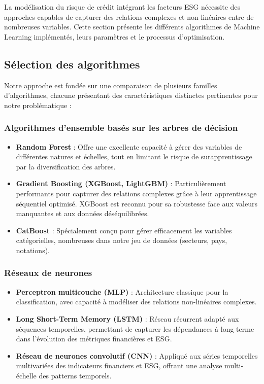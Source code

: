 La modélisation du risque de crédit intégrant les facteurs ESG nécessite des approches capables de capturer des relations complexes et non-linéaires entre de nombreuses variables. Cette section présente les différents algorithmes de Machine Learning implémentés, leurs paramètres et le processus d'optimisation.

\subsection{Sélection des algorithmes}

Notre approche est fondée sur une comparaison de plusieurs familles d'algorithmes, chacune présentant des caractéristiques distinctes pertinentes pour notre problématique :

\subsubsection{Algorithmes d'ensemble basés sur les arbres de décision}
\begin{itemize}
  \item \textbf{Random Forest} : Offre une excellente capacité à gérer des variables de différentes natures et échelles, tout en limitant le risque de surapprentissage par la diversification des arbres.
  \item \textbf{Gradient Boosting (XGBoost, LightGBM)} : Particulièrement performants pour capturer des relations complexes grâce à leur apprentissage séquentiel optimisé. XGBoost est reconnu pour sa robustesse face aux valeurs manquantes et aux données déséquilibrées.
  \item \textbf{CatBoost} : Spécialement conçu pour gérer efficacement les variables catégorielles, nombreuses dans notre jeu de données (secteurs, pays, notations).
\end{itemize}

\subsubsection{Réseaux de neurones}
\begin{itemize}
  \item \textbf{Perceptron multicouche (MLP)} : Architecture classique pour la classification, avec capacité à modéliser des relations non-linéaires complexes.
  \item \textbf{Long Short-Term Memory (LSTM)} : Réseau récurrent adapté aux séquences temporelles, permettant de capturer les dépendances à long terme dans l'évolution des métriques financières et ESG.
  \item \textbf{Réseau de neurones convolutif (CNN)} : Appliqué aux séries temporelles multivariées des indicateurs financiers et ESG, offrant une analyse multi-échelle des patterns temporels.
\end{itemize}

